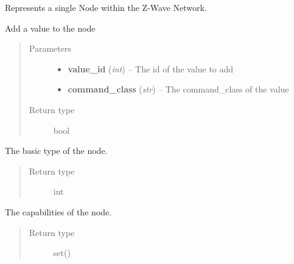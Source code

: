 \documentclass[letterpaper,10pt,english]{sphinxmanual}
\begin{document}
\begin{fulllineitems}
\label{node:openzwave.node.ZWaveNode}
Represents a single Node within the Z-Wave Network.

\begin{fulllineitems}
\label{node:openzwave.node.ZWaveNode.add_value}
Add a value to the node
\begin{quote}\begin{description}
\item[{Parameters}] \leavevmode\begin{itemize}
\item {} 
\textbf{value\_id} (\emph{int}) -- The id of the value to add

\item {} 
\textbf{command\_class} (\emph{str}) -- The command\_class of the value

\end{itemize}

\item[{Return type}] \leavevmode
bool

\end{description}\end{quote}

\end{fulllineitems}


\begin{fulllineitems}
\label{node:openzwave.node.ZWaveNode.basic}
The basic type of the node.
\begin{quote}\begin{description}
\item[{Return type}] \leavevmode
int

\end{description}\end{quote}

\end{fulllineitems}


\begin{fulllineitems}
\label{node:openzwave.node.ZWaveNode.capabilities}
The capabilities of the node.
\begin{quote}\begin{description}
\item[{Return type}] \leavevmode
set()


\end{description}
\end{quote}
\end{fulllineitems}
\end{fulllineitems}
\end{document}
